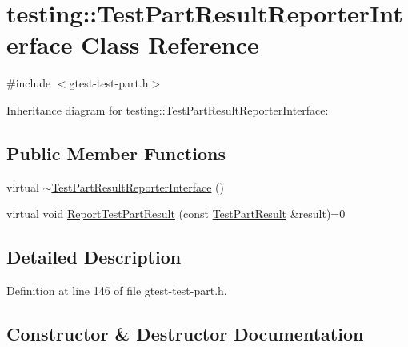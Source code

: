 \hypertarget{classtesting_1_1_test_part_result_reporter_interface}{}\section{testing\+:\+:Test\+Part\+Result\+Reporter\+Interface Class Reference}
\label{classtesting_1_1_test_part_result_reporter_interface}


{\ttfamily \#include $<$gtest-\/test-\/part.\+h$>$}



Inheritance diagram for testing\+:\+:Test\+Part\+Result\+Reporter\+Interface\+:
\subsection*{Public Member Functions}
\begin{DoxyCompactItemize}
\item 
virtual \hyperlink{classtesting_1_1_test_part_result_reporter_interface_a338b51591ed654f84dc0feaaf2b66917}{$\sim$\+Test\+Part\+Result\+Reporter\+Interface} ()
\item 
virtual void \hyperlink{classtesting_1_1_test_part_result_reporter_interface_aa2f920e7a5a0a6d0faf19e3727928c22}{Report\+Test\+Part\+Result} (const \hyperlink{classtesting_1_1_test_part_result}{Test\+Part\+Result} \&result)=0
\end{DoxyCompactItemize}


\subsection{Detailed Description}


Definition at line 146 of file gtest-\/test-\/part.\+h.



\subsection{Constructor \& Destructor Documentation}
